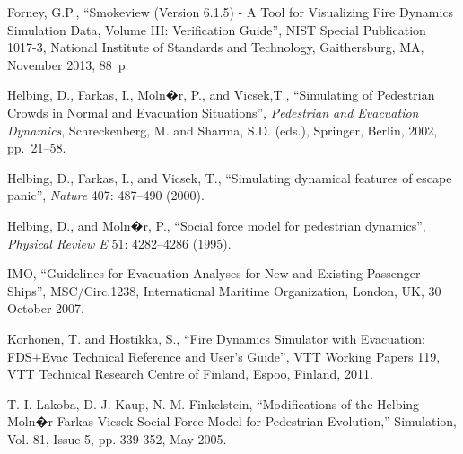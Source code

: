 \documentclass[english]{article}
\begin{document}
\begin{thebibliography}{References}




 Forney, G.P., ``Smokeview (Version 6.1.5)
- A Tool for Visualizing Fire Dynamics Simulation Data, Volume III:
Verification Guide'', NIST Special Publication 1017-3, National Institute
of Standards and Technology, Gaithersburg, MA, November 2013, 88~p.

 Helbing, D., Farkas, I., Moln�r, P., and Vicsek,T.,
``Simulating of Pedestrian Crowds in Normal and Evacuation Situations'',
\emph{Pedestrian and Evacuation Dynamics}, Schreckenberg, M. and Sharma,
S.D. (eds.), Springer, Berlin, 2002, pp.~21--58.

 Helbing, D., Farkas, I., and Vicsek, T., ``Simulating
dynamical features of escape panic'', \emph{Nature} 407: 487--490
(2000). %

 Helbing, D., and Moln�r, P., ``Social force
model for pedestrian dynamics'', \emph{Physical Review E} 51: 4282--4286
(1995). 

 IMO, ``Guidelines for Evacuation Analyses for New
and Existing Passenger Ships'', MSC/Circ.1238, International Maritime
Organization, London, UK, 30 October 2007.

 Korhonen, T. and Hostikka, S., ``Fire Dynamics
Simulator with Evacuation: FDS+Evac Technical Reference and User's
Guide'', VTT Working Papers 119, VTT Technical Research Centre of
Finland, Espoo, Finland, 2011.

T. I. Lakoba, D. J. Kaup, N. M. Finkelstein, \textquotedblleft Modifications
of the Helbing-Moln�r-Farkas-Vicsek Social Force Model for Pedestrian
Evolution,\textquotedblright{} Simulation, Vol. 81, Issue 5, pp. 339-352,
May 2005.


\end{thebibliography}
\end{document}
